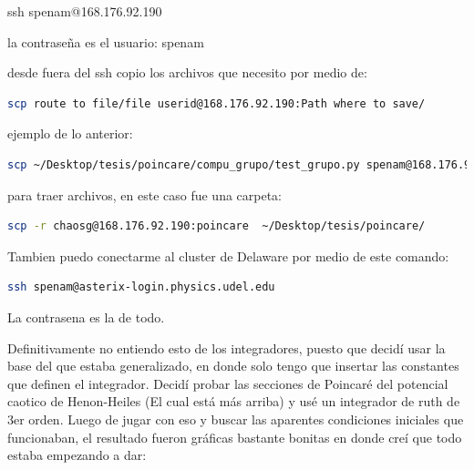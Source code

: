 \documentclass[idxtotoc,hyperref,openany]{labbook} %
\begin{document}
ssh spenam@168.176.92.190

la contraseña es el usuario: spenam

desde fuera del ssh copio los archivos que necesito por medio de: 
\begin{lstlisting}[language=bash]
scp route to file/file userid@168.176.92.190:Path where to save/
\end{lstlisting}
ejemplo de lo anterior: 
\begin{lstlisting}[language=bash]
scp ~/Desktop/tesis/poincare/compu_grupo/test_grupo.py spenam@168.176.92.190:poincare/
\end{lstlisting}
para traer archivos, en este caso fue una carpeta:
\begin{lstlisting}[language=bash]
scp -r chaosg@168.176.92.190:poincare  ~/Desktop/tesis/poincare/
\end{lstlisting}


Tambien puedo conectarme al cluster de Delaware por medio de este comando:
\begin{lstlisting}[language=bash]
ssh spenam@asterix-login.physics.udel.edu
\end{lstlisting}
La contrasena es la de todo.



Definitivamente no entiendo esto de los integradores, puesto que decidí usar la base del que estaba generalizado, en donde solo tengo que insertar las constantes que definen el integrador. Decidí probar las secciones de Poincaré del potencial caotico de Henon-Heiles (El cual está más arriba) y usé un integrador de ruth de 3er orden. Luego de jugar con eso y buscar las aparentes condiciones iniciales que funcionaban, el resultado fueron gráficas bastante bonitas en donde creí que todo estaba empezando a dar:
\end{document}
